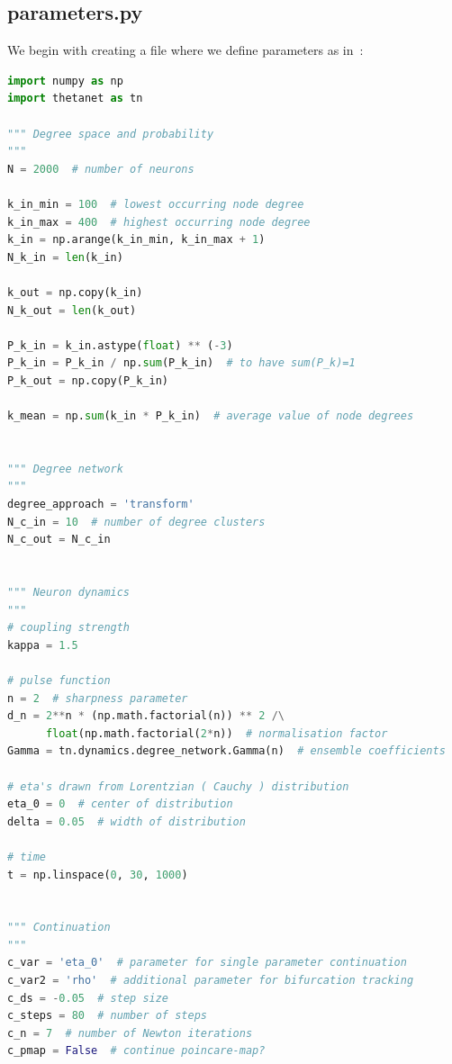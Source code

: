 \documentclass[bibliography=totoc, twoside]{article}
\numberwithin{equation}{section}
\begin{document}
\subsection*{parameters.py}
We begin with creating a file where we define parameters as in~\cite{laing2019}:
\begin{lstlisting}[language=python]
import numpy as np
import thetanet as tn

""" Degree space and probability
"""
N = 2000  # number of neurons

k_in_min = 100  # lowest occurring node degree
k_in_max = 400  # highest occurring node degree
k_in = np.arange(k_in_min, k_in_max + 1)
N_k_in = len(k_in)

k_out = np.copy(k_in)
N_k_out = len(k_out)

P_k_in = k_in.astype(float) ** (-3)
P_k_in = P_k_in / np.sum(P_k_in)  # to have sum(P_k)=1
P_k_out = np.copy(P_k_in)

k_mean = np.sum(k_in * P_k_in)  # average value of node degrees


""" Degree network
"""
degree_approach = 'transform'
N_c_in = 10  # number of degree clusters
N_c_out = N_c_in


""" Neuron dynamics
"""
# coupling strength
kappa = 1.5

# pulse function
n = 2  # sharpness parameter
d_n = 2**n * (np.math.factorial(n)) ** 2 /\
      float(np.math.factorial(2*n))  # normalisation factor
Gamma = tn.dynamics.degree_network.Gamma(n)  # ensemble coefficients

# eta's drawn from Lorentzian ( Cauchy ) distribution
eta_0 = 0  # center of distribution
delta = 0.05  # width of distribution

# time
t = np.linspace(0, 30, 1000)


""" Continuation
"""
c_var = 'eta_0'  # parameter for single parameter continuation
c_var2 = 'rho'  # additional parameter for bifurcation tracking
c_ds = -0.05  # step size
c_steps = 80  # number of steps
c_n = 7  # number of Newton iterations
c_pmap = False  # continue poincare-map?
\end{lstlisting}
\end{document}

